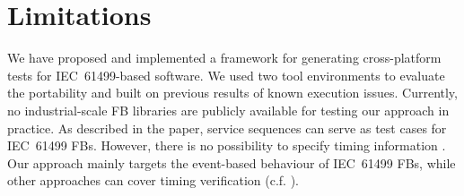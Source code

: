 \section{Limitations}
\label{sec::limitations}
We have proposed and implemented a framework for generating cross-platform tests for IEC~61499-based software. We used two tool environments to evaluate the portability and built on previous results of known execution issues. Currently, no industrial-scale FB libraries are publicly available for testing our approach in practice. As described in the paper, service sequences can serve as test cases for IEC~61499 FBs. However, there is no possibility to specify timing information \cite{Wiesmayr_ifac}. Our approach mainly targets the event-based behaviour of IEC~61499 FBs, while other approaches can cover timing verification (c.f. \cite{Bruns.2023}). 


\begin{comment}
    \item further research on test case generation would be useful
    \item no timing in the 1499 service sequences (e.g., send REQ every 15 ms), hence, also not part of the test generation approach
    \item timing also difficult to test with a test application, but well suitable for the typical problems of 1499 event-based systems
\end{comment}